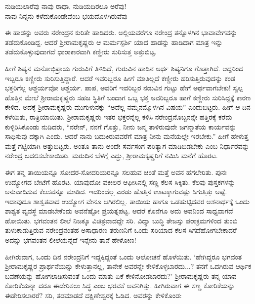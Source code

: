 \begin{myquote}
ನುಡಿಯಲಾರೆವು ನಾವು ರಾಧಾ, ನುಡಿಯದಿರಲೂ ಅರೆವು!\\ನಾವು ನಿನ್ನನು ಕಳೆದುಕೊಂಡೇವೆಂಬ ಭಯದೊಳಗಿರುವೆವು
\end{myquote}

ಈ ಹಾಡನ್ನು ಅವರು ನರೇಂದ್ರನ ಕುರಿತೇ ಹಾಡಿದರು. ಅಲ್ಲಿಯವರೆಗೂ ನರೇಂದ್ರ ತನ್ನೊಳಗಿನ ಭಾವಾವೇಗವನ್ನು ತಡೆದುಕೊಂಡಿದ್ದ. ಆದರೆ ಶ್ರೀರಾಮಕೃಷ್ಣರು ಆ ಮರ್ಮಸ್ಪರ್ಶಿ ಯಾದ ಹಾಡನ್ನು ಹಾಡಿದಾಗ ಮಾತ್ರ ಇನ್ನು ತಡೆದುಕೊಳ್ಳುವುದಾಗದೆ ಧಾರಾಕಾರವಾಗಿ ಕಣ್ಣೀರು ಸುರಿಸುತ್ತ ಅತ್ತುಬಿಟ್ಟ.

ಹೀಗೆ ಶಿಷ್ಯನ ಮನೋಭಿಪ್ರಾಯ ಗುರುವಿಗೆ ತಿಳಿದಿದೆ, ಗುರುವಿನ ಹಾಡಿನ ಅರ್ಥ ಶಿಷ್ಯನಿಗೂ ಗೊತ್ತಾಗಿದೆ. ಆದ್ದರಿಂದ ಇಬ್ಬರೂ ಕಣ್ಣೀರು ಸುರಿಸುತ್ತಿದ್ದಾರೆ. ಆದರೆ ಇವರಿಬ್ಬರೂ ಹೀಗೆ ಮಾತಿಲ್ಲದೆ ಕಣ್ಣೀರು ಹರಿಸುತ್ತಿರುವುದನ್ನು ಕಂಡ ಭಕ್ತರಿಗೆಲ್ಲ ಆಶ್ಚರ್ಯವೋ ಆಶ್ಚರ್ಯ. ಪಾಪ, ಅವರಿಗೆ ಇವರಿಬ್ಬರ ನಡುವಿನ ಗುಟ್ಟು ಹೇಗೆ ಅರ್ಥವಾಗಬೇಕು! ಸ್ವಲ್ಪ ಹೊತ್ತಿನ ಮೇಲೆ ಶ್ರೀರಾಮಕೃಷ್ಣರು ಸಹಜ ಸ್ಥಿತಿಗೆ ಬಂದಾಗ ಒಬ್ಬ ಭಕ್ತ ಅವರಿಬ್ಬರೂ ಹಾಗೆ ಕಣ್ಣೀರು ಸುರಿಸಿದ್ದಕ್ಕೆ ಕಾರಣ ಕೇಳಿದ. ಅದಕ್ಕೆ ಶ್ರೀರಾಮಕೃಷ್ಣರು ಮುಗುಳುನಕ್ಕು “ಅದೆಲ್ಲ ನಮ್ಮನಮ್ಮೊಳಗಿನ ವಿಷಯ” ಎಂದುಬಿಟ್ಟರು. ಹೀಗೆ ಆ ದಿನ ಕಳೆಯಿತು, ರಾತ್ರಿಯಾಯಿತು. ಶ್ರೀರಾಮಕೃಷ್ಣರು ಇತರ ಭಕ್ತರನ್ನೆಲ್ಲ ಕಳಿಸಿ ನರೇಂದ್ರನೊಬ್ಬನನ್ನೇ ಹತ್ತಿರಕ್ಕೆ ಕರೆದು ಕುಳ್ಳಿರಿಸಿಕೊಂಡು ನುಡಿದರು, “ನರೇನ್, ನನಗೆ ಗೊತ್ತು, ನೀನು ಜನ್ಮ ತಾಳಿರುವುದೇ ಜಗನ್ಮಾತೆಯ ಕಾರ್ಯವನ್ನು ಸಾಧಿಸುವು ದಕ್ಕಾಗಿ ಎಂದು. ಆದರೆ ನಾನು ಬದುಕಿರುವವರೆಗೆ ಮಾತ್ರ ನೀನು ಮನೆಯಲ್ಲೇ ಇರಬೇಕು.” ಹೀಗೆ ಹೇಳುತ್ತ ಮತ್ತೆ ಗಟ್ಟಿಯಾಗಿ ಅತ್ತುಬಿಟ್ಟರು. ಅಂತೂ ತಾನು ಅಂದೇ ಸರ್ವಸಂಗ ಪರಿತ್ಯಾಗ ಮಾಡಿಬಿಡಬೇಕು ಎಂಬ ನಿರ್ಧಾರವನ್ನು ನರೇಂದ್ರ ಬದಲಿಸಬೇಕಾಯಿತು. ಮರುದಿನ ಬೆಳಗ್ಗೆ ಎದ್ದು, ಶ್ರೀರಾಮಕೃಷ್ಣರಿಗೆ ನಮಿಸಿ ಮನೆಗೆ ಹೊರಟ.

ಈಗ ತನ್ನ ತಾಯಿಯನ್ನೂ ಸೋದರ-ಸೋದರಿಯರನ್ನೂ ಸಲಹುವ ಚಿಂತೆ ಮತ್ತೆ ಅವನ ಹೆಗಲೇರಿತು. ಪುನಃ ಉದ್ಯೋಗದ ಬೇಟೆಗೆ ಹೊರಟ. ಯಾವುದೋ ವಕೀಲರ ಆಫೀಸಿನಲ್ಲಿ ಸಣ್ಣ ಕೆಲಸ ಸಿಕ್ಕಿತು. ಕೆಲವು ಪುಸ್ತಕಗಳನ್ನು ಅನುವಾದಿಸುವ ಕೆಲಸವನ್ನೂ ಮಾಡಿದ. ಇದರಿಂದೆಲ್ಲ ಎರಡು ಹೊತ್ತಿನ ಊಟಕ್ಕಾಗುವಷ್ಟು ಸಿಗುತ್ತಿತ್ತು ಅಷ್ಟೆ. ಇದಾವುದೂ ಶಾಶ್ವತವಾದ ಉದ್ಯೋಗ ವೇನೂ ಆಗಿರಲಿಲ್ಲ. ತಾಯಿಯ ಹಾಗೂ ಒಡಹುಟ್ಟಿದವರ ಅಶನಾರ್ಥಕ್ಕೆ ಒಂದು ಶಾಶ್ವತ ವ್ಯವಸ್ಥೆ ಮಾಡಬೇಕೆಂದು ಅವನೆಷ್ಟೋ ಪ್ರಯತ್ನಪಟ್ಟ. ಆದರೆ ಕೊನೆಗೂ ಅದು ಅವನಿಂದ ಸಾಧ್ಯವಾಗದೆ ಹೋಯಿತು. ಭಗವಂತನ ಲೀಲೆ ನಿಜಕ್ಕೂ ವಿಚಿತ್ರವಾದದ್ದೇ ಸರಿ. ವಿದ್ಯಾ ಬುದ್ಧಿ ತೇಜಸ್ಸು ಪರಾಕ್ರಮಗಳಿಂದ ತುಂಬಿ ತುಳುಕಾಡುತ್ತಿರುವ ನರೇಂದ್ರನಂತಹ ಅಸಾಧಾರಣ ತರುಣನಿಗೆ ಒಂದು ಸರಿಯಾದ ಕೆಲಸ ಸಿಗದೆಹೋಗಬೇಕಾದರೆ ಅದನ್ನು ಭಗವಂತನ ಲೀಲೆಯೆನ್ನೆದೆ ಇನ್ನೇನು ತಾನೆ ಹೇಳೋಣ!

ಹೀಗಿರುವಾಗ, ಒಂದು ದಿನ ನರೇಂದ್ರನಿಗೆ ಇದ್ದಕ್ಕಿದ್ದಂತೆ ಒಂದು ಆಲೋಚನೆ ಹೊಳೆಯಿತು. ‘ಹೇಗಿದ್ದರೂ ಭಗವಂತ ಶ್ರೀರಾಮಕೃಷ್ಣರ ಪ್ರಾರ್ಥನೆಯನ್ನು ಕೇಳುತ್ತಾನಲ್ಲ, ತಾನೇಕೆ ಅವರನ್ನೇ ಕೇಳಿಕೊಳ್ಳಬಾರದು...? ತನಗೆ ಒದಗಿರುವ ಆರ್ಥಿಕ ಬವಣೆಯನ್ನು ಹೋಗಲಾಡಿಸುವಂತೆ ಒಂದು ಮಾತು ಏಕೆ ಕೇಳಿನೋಡಬಾರದು?’ ಶ್ರೀರಾಮಕೃಷ್ಣರು ತನ್ನ ಯಾವ ಕೋರಿಕೆಯನ್ನಾ ದರೂ ಈಡೇರಿಸಲು ಸಿದ್ಧ ಎಂಬ ಭರವಸೆ ಅವನಿಗಿತ್ತು. ಹೀಗಿರುವಾಗ ಈ ಸಣ್ಣ ಕೋರಿಕೆಯನ್ನು ಈಡೇರಿಸಲಾರರೆ? ಸರಿ, ತಡಮಾಡದೆ ದಕ್ಷಿಣೇಶ್ವರಕ್ಕೆ ಓಡಿದ. ಅವರನ್ನು ಕೇಳಿಕೊಂಡ:

